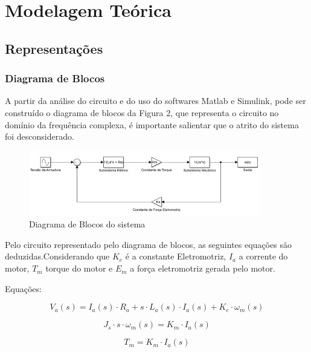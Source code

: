 \documentclass[12pt]{article}
\begin{document}
\section{Modelagem Teórica}

\subsection{Representações}

\subsubsection{Diagrama de Blocos}

\quad A partir da análise do circuito e do uso do softwares Matlab e Simulink, pode ser construído o diagrama de blocos da Figura 2, que representa o circuito no domínio da frequência complexa, é importante salientar que o atrito do sistema foi desconsiderado.

\begin{figure}[H] 
    \centering
    \includegraphics[width=0.9\textwidth]{Blocos.png}
    \caption{Diagrama de Blocos do sistema}
    \label{fig:mesh2}
\end{figure}

\quad Pelo circuito representado pelo diagrama de blocos, as seguintes equações são deduzidas.Considerando que $K_e$ é a constante Eletromotriz, $I_a$ a corrente do motor, $T_m$ torque do motor e $E_m$ a força eletromotriz gerada pelo motor.
\\\par Equações:

\begin{equation}
    V_a (s) = I_a(s) \cdot R_a + s\cdot L_a(s)\cdot I_a (s) + K_e\cdot \omega_m (s)
\end{equation}

\begin{equation}
    J_s\cdot s \cdot \omega_m (s) = K_m \cdot I_a (s)
\end{equation}

\begin{equation}
    T_m = K_m \cdot I_a (s)
\end{equation}
\end{document}
